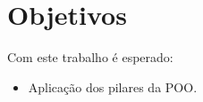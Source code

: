 \section{Objetivos}
Com este trabalho é esperado: 
\begin{itemize}
	\item Aplicação dos pilares da POO.
\end{itemize}